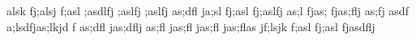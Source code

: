 alsk fj;alsj f;asl ;asdlfj ;aslfj ;aslfj as;dfl
ja;sl fj;asl fj;aslfj as;l fjas; fjas;flj as;fj
asdf 
a;lsdfjas;lkjd f
as;dfl jas;dflj as;fl jas;fl jas;fl jas;flas
jf;lsjk f;asl fj;asl fjasdflj
